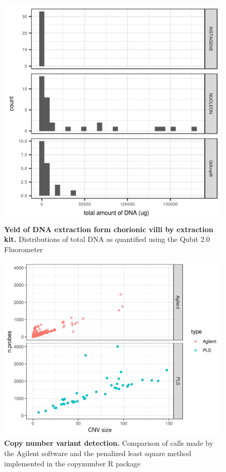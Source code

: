\begin{figure}[ht]
    \centering
    \includegraphics[width= 14 cm, high= 16cm]{fig/totaldna_bykit.png}
    \caption{\textbf{Yeld of DNA extraction form chorionic villi by extraction kit.} Distributions of total DNA as quantified using the  Qubit 2.0 Fluorometer} 
    \label{fig:dnayeld}
\end{figure}

\begin{figure}[ht]
    \centering
    \includegraphics[width= 14 cm, high= 16cm]{fig/cnvCallComparison.png}
    \caption{\textbf{Copy number variant detection.} Comparison of calls made by the Agilent software and the penalized least square method implemented in the copynumber R package \cite{nilsen2012copynumber}} 
    \label{fig:cnvmethods}
\end{figure}